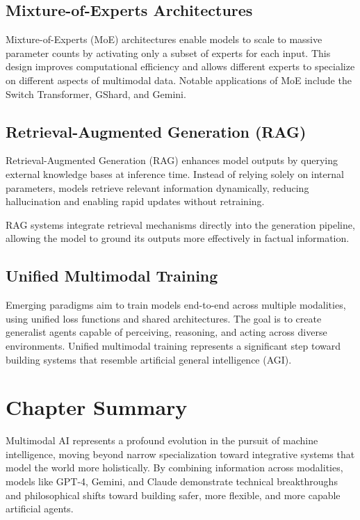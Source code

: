 \documentclass[openany]{book}
\begin{document}
\subsection{Mixture-of-Experts Architectures}

Mixture-of-Experts (MoE) architectures enable models to scale to massive parameter 
counts by activating only a subset of experts for each input. This design improves 
computational efficiency and allows different experts to specialize on different 
aspects of multimodal data. Notable applications of MoE include the Switch 
Transformer, GShard, and Gemini.

\subsection{Retrieval-Augmented Generation (RAG)}

Retrieval-Augmented Generation (RAG) enhances model outputs by querying external 
knowledge bases at inference time. Instead of relying solely on internal 
parameters, models retrieve relevant information dynamically, reducing 
hallucination and enabling rapid updates without retraining.

RAG systems integrate retrieval mechanisms directly into the generation pipeline, 
allowing the model to ground its outputs more effectively in factual information.

\subsection{Unified Multimodal Training}

Emerging paradigms aim to train models end-to-end across multiple modalities, using 
unified loss functions and shared architectures. The goal is to create generalist 
agents capable of perceiving, reasoning, and acting across diverse environments. 
Unified multimodal training represents a significant step toward building systems 
that resemble artificial general intelligence (AGI).

\section{Chapter Summary}

Multimodal AI represents a profound evolution in the pursuit of machine 
intelligence, moving beyond narrow specialization toward integrative systems that 
model the world more holistically. By combining information across modalities, 
models like GPT-4, Gemini, and Claude demonstrate technical breakthroughs and 
philosophical shifts toward building safer, more flexible, and more capable 
artificial agents.
\end{document}
